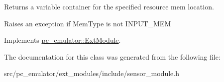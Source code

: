 Returns a variable container for the specified resource mem location. 

Raises an exception if Mem\+Type is not I\+N\+P\+U\+T\+\_\+\+M\+EM 

Implements \hyperlink{classpc__emulator_1_1ExtModule_ab62dc4b158134b37e1851a79e009b194}{pc\+\_\+emulator\+::\+Ext\+Module}.



The documentation for this class was generated from the following file\+:\begin{DoxyCompactItemize}
\item 
src/pc\+\_\+emulator/ext\+\_\+modules/include/sensor\+\_\+module.\+h\end{DoxyCompactItemize}
